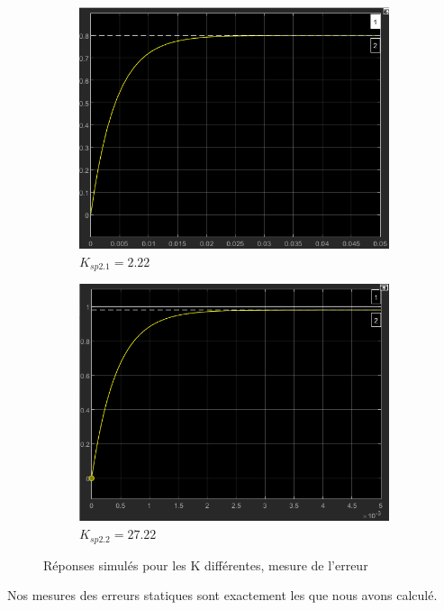 \documentclass[12pt, a4paper]{report}
\begin{document}
\begin{figure}[h]
\begin{subfigure}[h!]{0.4\linewidth}
        \includegraphics[width=\linewidth]{s1simk2.png}
        \caption{$K_{sp2.1} = 2.22$}
    \end{subfigure}
    \hfill
    \begin{subfigure}[h!]{0.4\linewidth}
        \includegraphics[width=\linewidth]{s1simk27.png}
        \caption{$K_{sp2.2} = 27.22$}
    \end{subfigure}
    \caption{Réponses simulés pour les K différentes, mesure de l'erreur}
\end{figure}

Nos mesures des erreurs statiques sont exactement les que nous avons calculé.
\end{document}
